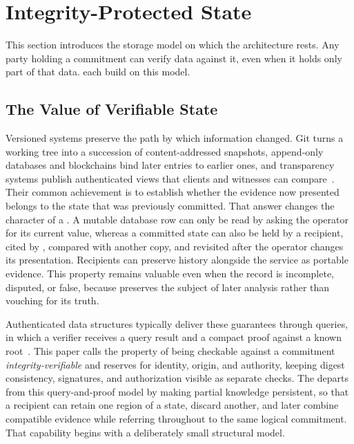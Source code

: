 \section{Integrity-Protected State}
\label{sec:integrity-state}

This section introduces the storage model on which the architecture rests. Any party holding a commitment can verify data against it, even when it holds only part of that data.  each build on this model.

\subsection{The Value of Verifiable State}

Versioned systems preserve the path by which information changed. Git turns a working tree into a succession of content-addressed snapshots, append-only databases and blockchains bind later entries to earlier ones, and transparency systems publish authenticated views that clients and witnesses can compare~\cite{Haber1991timestamp,Laurie2014certificate,Melara2015coniks}. Their common achievement is to establish whether the evidence now presented belongs to the state that was previously committed. That answer changes the character of a . A mutable database row can only be read by asking the operator for its current value, whereas a committed state can also be held by a recipient, cited by , compared with another copy, and revisited after the operator changes its presentation. Recipients can preserve history alongside the service as portable evidence. This property remains valuable even when the record is incomplete, disputed, or false, because  preserves the subject of later analysis rather than vouching for its truth.

Authenticated data structures typically deliver these guarantees through queries, in which a verifier receives a query result and a compact proof against a known root~\cite{Martel2004general,Miller2014authenticated}. This paper calls the property of being checkable against a commitment \emph{integrity-verifiable} and reserves  for identity, origin, and authority, keeping digest consistency, signatures, and authorization visible as separate checks. The  departs from this query-and-proof model by making partial knowledge persistent, so that a recipient can retain one region of a state, discard another, and later combine compatible evidence while referring throughout to the same logical commitment. That capability begins with a deliberately small structural model.

